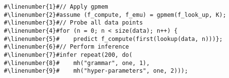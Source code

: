 \begin{mdframed}
\begin{minipage}{\linewidth}
\small
\belowcaptionskip=-10pt
\begin{lstlisting}[mathescape,label=alg:structureVent,basicstyle=\selectfont\ttfamily,numbers=none,caption={\gpmem\
inference for structure
learning: },escapechar=\#]
#\linenumber{1}#// Apply gpmem 
#\linenumber{2}#assume (f_compute, f_emu) = gpmem(f_look_up, K);
#\linenumber{3}#// Probe all data points
#\linenumber{4}#for (n = 0; n < size(data); n++) { 
#\linenumber{5}#	predict f_compute(first(lookup(data, n)))};
#\linenumber{6}#// Perform inference
#\linenumber{7}#infer repeat(200, do(
#\linenumber{8}#	mh("grammar", one, 1),
#\linenumber{9}#	mh("hyper-parameters", one, 2)));
\end{lstlisting}

\end{minipage}
\end{mdframed}
